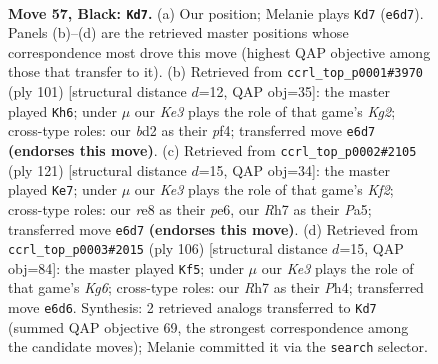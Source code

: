 \documentclass[11pt]{article}
\begin{document}
\clearpage

\begin{figure}[p]\centering
\begin{subfigure}{0.46\textwidth}\centering
\resizebox{\linewidth}{!}{%
\newchessgame
\chessboard[
  setfen={4R3/7r/3Pk3/1p6/4K3/r7/1p1B4/8 b - - 3 57},
  showmover=false,
  pgfstyle=straightmove, color=movearrow, markmove={e6-d7}
]}
\caption{}
\end{subfigure}\hfill
\begin{subfigure}{0.46\textwidth}\centering
\resizebox{\linewidth}{!}{%
\newchessgame
\chessboard[
  setfen={8/1R4k1/4p1P1/2r5/5P2/8/5K2/8 b - - 2 51},
  showmover=false,
  pgfstyle=straightmove, color=movearrow, markmove={g7-h6}
]}
\caption{}
\end{subfigure}
\\[4pt]
\begin{subfigure}{0.46\textwidth}\centering
\resizebox{\linewidth}{!}{%
\newchessgame
\chessboard[
  setfen={8/5k2/4P3/p2p3P/7r/1K6/8/6R1 b - - 0 61},
  showmover=false,
  pgfstyle=straightmove, color=movearrow, markmove={f7-e7}
]}
\caption{}
\end{subfigure}\hfill
\begin{subfigure}{0.46\textwidth}\centering
\resizebox{\linewidth}{!}{%
\newchessgame
\chessboard[
  setfen={7k/R7/5pK1/8/6rP/8/5P2/8 w - - 6 54},
  showmover=false,
  pgfstyle=straightmove, color=movearrow, markmove={g6-f5}
]}
\caption{}
\end{subfigure}
\caption{\textbf{Move 57, Black: \texttt{Kd7}.} (a) Our position; Melanie plays \texttt{Kd7} (\texttt{e6d7}). Panels (b)--(d) are the retrieved master positions whose correspondence most drove this move (highest QAP objective among those that transfer to it). (b) Retrieved from \texttt{ccrl\_top\_p0001\#3970} (ply 101) [structural distance $d$=12, QAP obj=35]: the master played \texttt{Kh6}; under $\mu$ our \emph{Ke3} plays the role of that game's \emph{Kg2}; cross-type roles: our \emph{b}d2 as their \emph{p}f4; transferred move \texttt{e6d7} \textbf{(endorses this move)}. (c) Retrieved from \texttt{ccrl\_top\_p0002\#2105} (ply 121) [structural distance $d$=15, QAP obj=34]: the master played \texttt{Ke7}; under $\mu$ our \emph{Ke3} plays the role of that game's \emph{Kf2}; cross-type roles: our \emph{r}e8 as their \emph{p}e6, our \emph{R}h7 as their \emph{P}a5; transferred move \texttt{e6d7} \textbf{(endorses this move)}. (d) Retrieved from \texttt{ccrl\_top\_p0003\#2015} (ply 106) [structural distance $d$=15, QAP obj=84]: the master played \texttt{Kf5}; under $\mu$ our \emph{Ke3} plays the role of that game's \emph{Kg6}; cross-type roles: our \emph{R}h7 as their \emph{P}h4; transferred move \texttt{e6d6}. Synthesis: 2 retrieved analogs transferred to \texttt{Kd7} (summed QAP objective 69, the strongest correspondence among the candidate moves); Melanie committed it via the \texttt{search} selector.}
\label{fig:thought-m113}
\end{figure}
\end{document}
